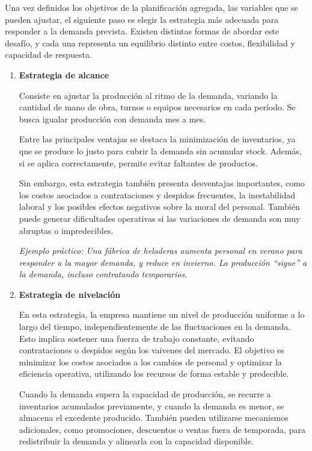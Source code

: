 \documentclass[a4paper,oneside,11pt]{article}
\begin{document}
Una vez definidos los objetivos de la planificación agregada, las variables que se pueden ajustar, el siguiente paso es elegir la estrategia más adecuada para responder a la demanda prevista. Existen distintas formas de abordar este desafío, y cada una representa un equilibrio distinto entre costos, flexibilidad y capacidad de respuesta.

\begin{enumerate}
    \item \textbf{Estrategia de alcance}

    Consiste en ajustar la producción al ritmo de la demanda, variando la cantidad de mano de obra, turnos o equipos necesarios en cada período. Se busca igualar 
    producción con demanda mes a mes.

    Entre las principales ventajas se destaca la minimización de inventarios, ya que se produce lo justo para cubrir la demanda sin acumular stock. Además, si se aplica correctamente, permite evitar faltantes de productos.

    Sin embargo, esta estrategia también presenta desventajas importantes, como los costos asociados a contrataciones y despidos frecuentes, la inestabilidad laboral y los posibles efectos negativos sobre la moral del personal. También puede generar dificultades operativas si las variaciones de demanda son muy abruptas o impredecibles.

    \textit{Ejemplo práctico:
    Una fábrica de heladeras aumenta personal en verano para responder a la mayor demanda, y reduce en invierno. La producción “sigue” a la demanda, incluso contratando temporarios.}

    \item \textbf{Estrategia de nivelación}

    En esta estrategia, la empresa mantiene un nivel de producción uniforme a lo largo del tiempo, independientemente de las fluctuaciones en la demanda. Esto implica sostener una fuerza de trabajo constante, evitando contrataciones o despidos según los vaivenes del mercado. El objetivo es minimizar los costos asociados a los cambios de personal y optimizar la eficiencia operativa, utilizando los recursos de forma estable y predecible.

    Cuando la demanda supera la capacidad de producción, se recurre a inventarios acumulados previamente, y cuando la demanda es menor, se almacena el excedente producido. También pueden utilizarse mecanismos adicionales, como promociones, descuentos o ventas fuera de temporada, para redistribuir la demanda y alinearla con la capacidad disponible.
    

\end{enumerate}
\end{document}
